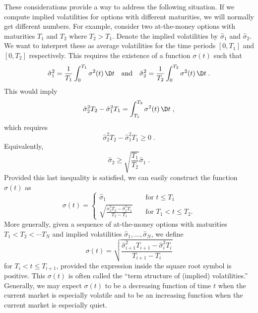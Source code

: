 These considerations provide a way to address the following situation.  If we compute implied volatilities for options with different maturities, we will normally get different numbers.  For example, consider two at-the-money  options with maturities $T_1$ and $T_2$ where $T_2>T_1$.  Denote the implied volatilities by $\hat{\sigma}_1$ and $\hat{\sigma}_2$.  We want to interpret these as average volatilities for the time periods $[0,T_1]$ and $[0,T_2]$ respectively.  This requires the existence of a function $\sigma(t)$ such that
$$\hat{\sigma}_1^2 = \frac{1}{T_1}\int_0^{T_1} \sigma^2(t)\,\D t \quad \text{and} \quad \hat{\sigma}_2^2 = \frac{1}{T_2}\int_0^{T_2} \sigma^2(t)\,\D t\; .$$
This would imply
$$\hat{\sigma}_2^2T_2 - \hat{\sigma}_1^2T_1 = \int_{T_1}^{T_2} \sigma^2(t)\,\D t\; ,$$
which requires
$$\hat{\sigma}_2^2T_2 - \hat{\sigma}_1^2T_1 \geq 0\; .$$
Equivalently,
$$\hat{\sigma}_2 \geq \sqrt{\frac{T_1}{T_2}} \hat{\sigma}_1\; .$$
Provided this last inequality is satisfied, we can easily construct the function $\sigma(t)$ as
$$\sigma(t) = \begin{cases} \hat{\sigma}_1 & \quad\text{for $t\leq T_1$} \\
\sqrt{\frac{\hat{\sigma}_2^2T_2 - \hat{\sigma}_1^2T_1}{T_2-T_1}} &\quad\text{for $T_1 < t\leq T_2$}.
\end{cases}$$
More generally, given a sequence of at-the-money options with maturities $T_1<T_2<\cdots T_N$ and implied volatilities $\hat{\sigma}_1,\dots,\hat{\sigma}_N$, we define
$$\sigma(t) = \sqrt{\frac{\hat{\sigma}_{i+1}^2T_{i+1} - \hat{\sigma}_i^2T_i}{T_{i+1}-T_i}}$$
for $T_i<t\leq T_{i+1}$, provided the expression inside the square root symbol is positive. This $\sigma(t)$ is often called the ``term structure of (implied) volatilities.''   Generally, we may expect $\sigma(t)$ to be a decreasing function of time $t$ when the current market is especially volatile and to be an increasing function when the current market is especially quiet.  

